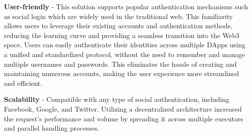 \documentclass[../Main.tex]{subfiles}
\begin{document}
\indent\textbf{User-friendly} - This solution supports popular authentication mechanisms such as social login which are widely used in the traditional web. This familiarity allows users to leverage their existing accounts and authentication methods, reducing the learning curve and providing a seamless transition into the Web3 space. Users can easily authenticate their identities across multiple DApps using a unified and standardized protocol, without the need to remember and manage multiple usernames and passwords. This eliminates the hassle of creating and maintaining numerous accounts, making the user experience more streamlined and efficient.

\indent\textbf{Scalability} - Compatible with any type of social authentication, including Facebook, Google, and Twitter. Utilizing a decentralized architecture increased the request's performance and volume by spreading it across multiple executors and parallel handling processes.
\newpage
\end{document}
